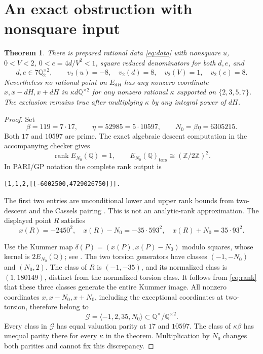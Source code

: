 \documentclass[11pt]{article}
\newcommand{\Q}{\mathbb Q}
\newcommand{\Z}{\mathbb Z}
\newtheorem{theorem}{Theorem}
\theoremstyle{remark}\newtheorem{remark}[theorem]{Remark}
\begin{document}
\section{An exact obstruction with nonsquare input}
\begin{theorem}\label{thm:counter}
There is prepared rational data \eqref{eq:data} with nonsquare \(u\),
\(0<V<2\), \(0<e=4d/V^2<1\), square reduced denominators for both
\(d,e\), and
\[
 d,e\in7\Q_2^{\times2},\qquad
 v_2(u)=-8,\quad v_2(d)=8,\quad v_2(V)=1,\quad v_2(e)=8.
\]
Nevertheless no rational point on \(E_{dH}\) has any nonzero coordinate
\(x,x-dH,x+dH\) in \(\kappa d\Q^{\times2}\) for any nonzero rational
\(\kappa\) supported on \(\{2,3,5,7\}\). The exclusion remains true
after multiplying \(\kappa\) by any integral power of \(dH\).
\end{theorem}
\begin{proof}
Set
\[
 \beta=119=7\cdot17,\qquad \eta=52985=5\cdot10597,
 \qquad N_0=\beta\eta=6305215.
\]
Both \(17\) and \(10597\) are prime. The exact algebraic descent
computation in the accompanying checker gives
\begin{equation}\label{eq:rank}
 \operatorname{rank}E_{N_0}(\Q)=1,
 \qquad E_{N_0}(\Q)_{\mathrm{tors}}\cong(\Z/2\Z)^2.
\end{equation}
In PARI/GP notation the complete rank output is
\begin{verbatim}
[1,1,2,[[-6002500,4729026750]]].
\end{verbatim}
The first two entries are unconditional lower and upper rank bounds
from two-descent and the Cassels pairing \cite{pari}. This is not an
analytic-rank approximation. The displayed point \(R\) satisfies
\begin{equation}\label{eq:point}
 x(R)=-2450^2,\quad x(R)-N_0=-35\cdot593^2,\quad
 x(R)+N_0=35\cdot93^2.
\end{equation}

Use the Kummer map \(\delta(P)=(x(P),x(P)-N_0)\) modulo squares,
whose kernel is \(2E_{N_0}(\Q)\); see \cite[Section~3.2]{burungale}.
The two torsion generators have classes \((-1,-N_0)\) and \((N_0,2)\).
The class of \(R\) is \((-1,-35)\), and its normalized class is
\((1,180149)\), distinct from the normalized torsion class. It follows
from \eqref{eq:rank} that these three classes generate the entire
Kummer image. All nonzero coordinates \(x,x-N_0,x+N_0\), including
the exceptional coordinates at two-torsion, therefore belong to
\begin{equation}\label{eq:G}
 \mathcal G=\langle-1,2,35,N_0\rangle
       \subset\Q^\times/\Q^{\times2}.
\end{equation}
Every class in \(\mathcal G\) has equal valuation parity at \(17\) and
\(10597\). The class of \(\kappa\beta\) has unequal parity there for
every \(\kappa\) in the theorem. Multiplication by \(N_0\) changes
both parities and cannot fix this discrepancy.


\end{proof}
\end{document}
